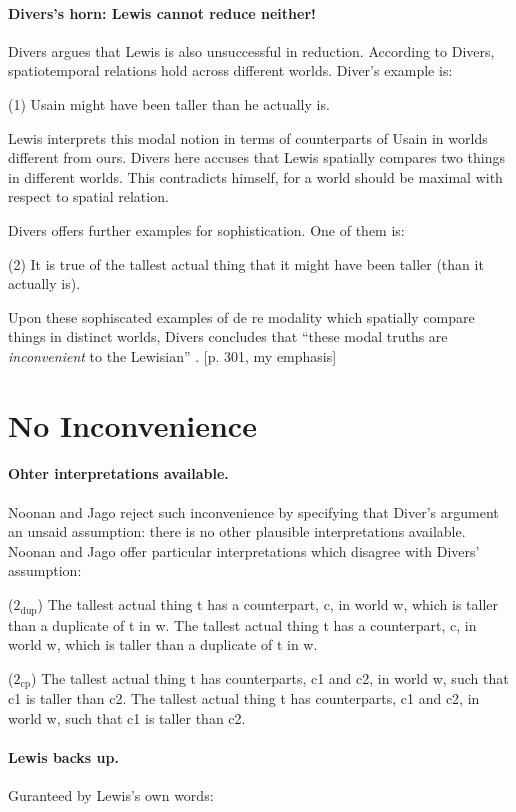 \documentclass[
10pt, %
a4paper, %
twocolumn, %
landscape %
]{article}
\begin{document}
\paragraph{Divers's horn: Lewis cannot reduce neither!}
Divers argues that Lewis is also unsuccessful in reduction.  According to Divers, spatiotemporal relations hold across different worlds.
Diver's example is:

\noindent (1) Usain might have been taller than he actually is.

Lewis interprets this modal notion in terms of counterparts of Usain in worlds different from ours. Divers here accuses that Lewis spatially compares two things in different worlds. This contradicts himself, for a world should be maximal with respect to spatial relation.

Divers offers further examples for sophistication. One of them is:

\noindent
(2) It is true of the tallest actual thing that it might have been taller (than it actually is).

Upon these sophiscated examples of de re modality which spatially compare things in distinct worlds, Divers concludes that ``these modal truths are \emph{inconvenient} to the Lewisian'' . [p. 301, my emphasis]


\section{No Inconvenience}

\paragraph{Ohter interpretations available. }
Noonan and Jago reject such inconvenience by specifying that Diver's argument an unsaid assumption: there is no other plausible interpretations available.
Noonan and Jago offer particular interpretations which disagree with Divers' assumption:

($2_{\text{dup}}$) The tallest actual thing t has a counterpart, c, in world w, which is taller than a duplicate of t in w.
The tallest actual thing t has a counterpart, c, in world w, which is taller than a duplicate of t in w.

($2_{\text{cp}}$) The tallest actual thing t has counterparts, c1 and c2, in world w, such that c1 is taller than c2.
The tallest actual thing t has counterparts, c1 and c2, in world w, such that c1 is taller than c2.

\paragraph{Lewis backs up. }
Guranteed by Lewis's own words:
\end{document}
